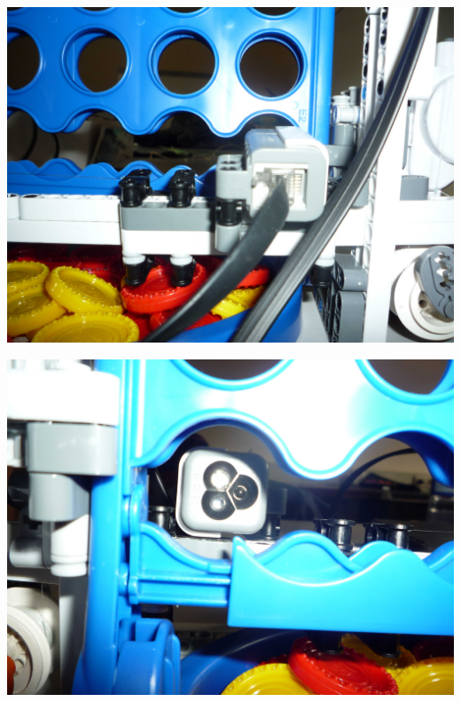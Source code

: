 \documentclass[12pt]{report}
\begin{document}
\begin{center}
		\includegraphics[width=0.7\linewidth]{images/Capteur.JPG}
\end{center}

\begin{center}
	\includegraphics[width=0.7\linewidth]{images/Capteur1.JPG}
\end{center}
\end{document}
